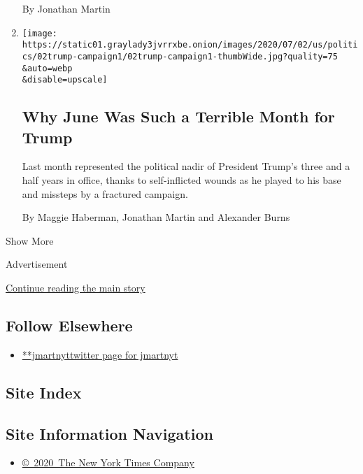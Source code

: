 \begin{enumerate}
  By Jonathan Martin
\item
  \href{/2020/07/02/us/politics/trump-2020-campaign-problems.html}{}

  \texttt{[image: https://static01.graylady3jvrrxbe.onion/images/2020/07/02/us/politics/02trump-campaign1/02trump-campaign1-thumbWide.jpg?quality=75\\\&auto=webp\\\&disable=upscale]}

  \hypertarget{why-june-was-such-a-terrible-month-for-trump}{%
  \subsection{Why June Was Such a Terrible Month for
  Trump}\label{why-june-was-such-a-terrible-month-for-trump}}

  Last month represented the political nadir of President Trump's three
  and a half years in office, thanks to self-inflicted wounds as he
  played to his base and missteps by a fractured campaign.

  By Maggie Haberman, Jonathan Martin and Alexander Burns
\end{enumerate}

Show More

Advertisement

\protect\hyperlink{after-mid2}{Continue reading the main story}

\hypertarget{follow-elsewhere}{%
\subsection{Follow Elsewhere}\label{follow-elsewhere}}

\begin{itemize}
\tightlist
\item
  \href{https://twitter.com/jmartnyt}{**jmartnyttwitter page for
  jmartnyt}
\end{itemize}

\hypertarget{site-index}{%
\subsection{Site Index}\label{site-index}}

\hypertarget{site-information-navigation}{%
\subsection{Site Information
Navigation}\label{site-information-navigation}}

\begin{itemize}
\tightlist
\item
  \href{https://help.nytimes3xbfgragh.onion/hc/en-us/articles/115014792127-Copyright-notice}{©~2020~The
  New York Times Company}
\end{itemize}

